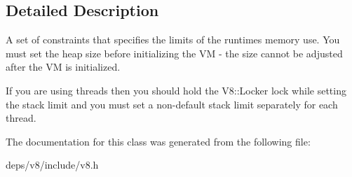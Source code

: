 \subsection{Detailed Description}
A set of constraints that specifies the limits of the runtime\textquotesingle{}s memory use. You must set the heap size before initializing the V\+M -\/ the size cannot be adjusted after the V\+M is initialized.

If you are using threads then you should hold the V8\+::\+Locker lock while setting the stack limit and you must set a non-\/default stack limit separately for each thread. 

The documentation for this class was generated from the following file\+:\begin{DoxyCompactItemize}
\item 
deps/v8/include/v8.\+h\end{DoxyCompactItemize}
